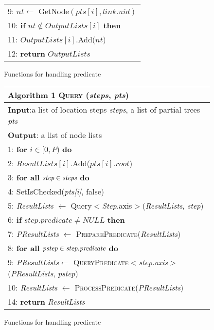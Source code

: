 \begin{figure}[t]
\begin{tabular}{l}
		9: \hspace{8 mm} $nt \leftarrow$ GetNode$(pts[i], link.uid)$ \\
		10:\hspace{8 mm} \textbf{if} $nt \not \in OutputLists[i]$ \textbf{then}  \\
		11:\hspace{12 mm} $OutputLists[i]$.Add($nt$) \\
		12:\hspace{1 mm} \textbf{return} $OutputLists$ \\
		\hline
	\end{tabular}
	\caption{Functions for handling predicate}
\end{figure}


\begin{figure}[t]
	\centering
	\label{fig:algQuery}
	\begin{tabular}{l}
		\hline
		\textbf{Algorithm 1} \textsc{Query} (\emph{steps}, \emph{pts}) \\
		\hline
		\textbf{Input}:a list of location steps \emph{steps}, a list of partial trees \emph{pts} \\
		\textbf{Output}: a list of node lists  \\
		1: \hspace{1 mm} \textbf{for} $i \in [0, P)$ \textbf{do} \\
		2: \hspace{4 mm} $ResultLists[i]$.Add($pts[i].root$) \\
		3: \hspace{1 mm} \textbf{for all} $\emph{step} \in \emph{steps}$ \textbf{do} \\
		4: \hspace{4 mm} SetIsChecked(\emph{pts[i]}, false) \\
		5: \hspace{4 mm} \emph{ResultLists} $ \leftarrow $ Query$<$\emph{Step}.axis$>$(\emph{ResultLists}, \emph{step})\\
		6: \hspace{4 mm} \textbf{if} $step.predicate \neq NULL$ \textbf{then} \\
		7: \hspace{8 mm} \emph{PResultLists} $\leftarrow$ \textsc{PreparePredicate}(\emph{ResultLists}) \\
		8: \hspace{8 mm} \textbf{for all} $\emph{pstep} \in \emph{step.predicate}$ \textbf{do} \\
		9: \hspace{12 mm} \emph{PResultLists}$ \leftarrow $ \textsc{QueryPredicate}$<$\emph{step.axis}$>$ (\emph{PResultLists}, \emph{pstep}) \\
		10: \hspace{3 mm} \emph{ResultLists} $ \leftarrow $ \textsc{ProcessPredicate}(\emph{PResultLists})  \\
		14: \hspace{0 mm} \textbf{return} \emph{ResultLists} \\
		\hline
	\end{tabular}
	\caption{Functions for handling predicate}
\end{figure}

